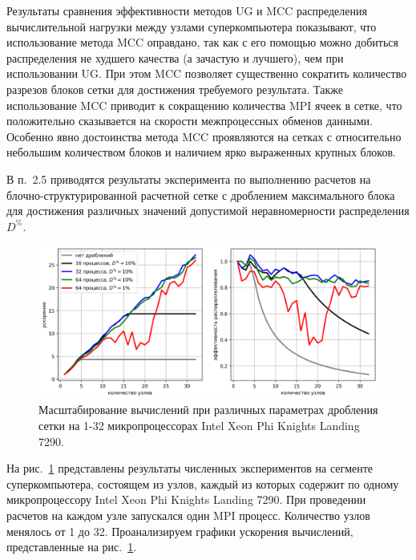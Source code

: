 \documentclass[a4paper,14pt]{extarticle}                     %
\theoremstyle{plain}                                         %
\begin{document}
Результаты сравнения эффективности методов UG и MCC распределения вычислительной нагрузки между узлами суперкомпьютера показывают, что использование метода MCC оправдано, так как с его помощью можно добиться распределения не худшего качества (а зачастую и лучшего), чем при использовании UG.
При этом MCC позволяет существенно сократить количество разрезов блоков сетки для достижения требуемого результата.
Также использование MCC приводит к сокращению количества MPI ячеек в сетке, что положительно сказывается на скорости межпроцессных обменов данными.
Особенно явно достоинства метода MCC проявляются на сетках с относительно небольшим количеством блоков и наличием ярко выраженных крупных блоков.


В п.~2.5 приводятся результаты эксперимента по выполнению расчетов на блочно-структурированной расчетной сетке с дроблением максимального блока для достижения различных значений допустимой неравномерности распределения $D^{\%}$.

\begin{figure}[ht]
\centering
\includegraphics[width=1.0\textwidth]{./pics/text_2_withcut/scaling3.png}
\singlespacing
{}\caption{Масштабирование вычислений при различных параметрах дробления сетки на 1-32 микропроцессорах Intel Xeon Phi Knights Landing 7290.}
\label{fig:text_2_withcut_scaling3}
\end{figure}

На рис.~\ref{fig:text_2_withcut_scaling3} представлены результаты численных экспериментов на сегменте суперкомпьютера, состоящем из узлов, каждый из которых содержит по одному микропроцессору Intel Xeon Phi Knights Landing 7290.
При проведении расчетов на каждом узле запускался один MPI процесс.
Количество узлов менялось от 1 до 32.
Проанализируем графики ускорения вычислений, представленные на рис.~\ref{fig:text_2_withcut_scaling3}.
\end{document}
